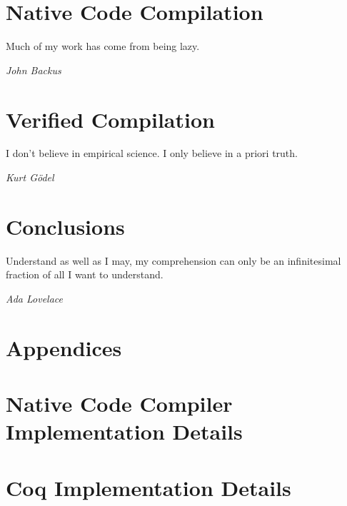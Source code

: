 \documentclass[botnum,letterpaper]{unmeethesis}
\begin{document}
\chapter{Native Code Compilation}\label{chap:cem}
\epigraph{Much of my work has come from being lazy.}{\textit{John Backus}}






\chapter{Verified Compilation}\label{chap:verified}
\epigraph{I don't believe in empirical science. I only believe in a priori
truth.}{\textit{Kurt Gödel}}









\chapter{Conclusions}\label{chap:conclusion}
\epigraph{Understand as well as I may, my comprehension can only be an
infinitesimal fraction of all I want to understand.}{\textit{Ada Lovelace}}


\chapter*{Appendices}

\appendix
\chapter{Native Code Compiler Implementation Details}\label{chap:cem_appendix}
 

\chapter{Coq Implementation Details}\label{chap:coq_appendix}
 



\end{document}
